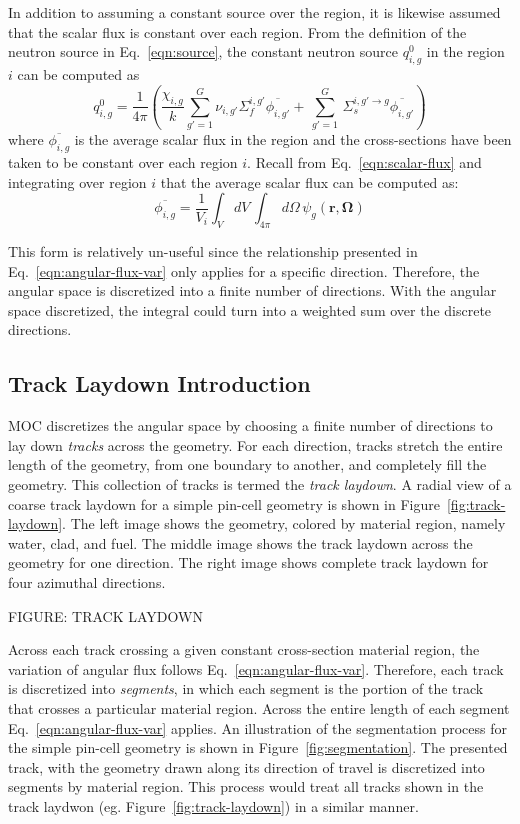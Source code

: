 In addition to assuming a constant source over the region, it is likewise assumed that the scalar flux is constant over each region. From the definition of the neutron source in Eq.~\ref{eqn:source}, the constant neutron source $q^0_{i,g}$ in the region $i$ can be computed as
\begin{equation}
q^0_{i,g} = \frac{1}{4 \pi} \left( \frac{\chi_{i,g}}{k} \sum_{g'=1}^{G} \nu_{i,g'} \Sigma_f^{i,g'} \overline{\phi_{i,g'}} + \, \sum_{g'=1}^G \,  \Sigma_{s}^{i,g' \rightarrow g} \overline{\phi_{i,g'}} \right)
\label{eqn:source-discr}
\end{equation}
where $\overline{\phi_{i,g}}$ is the average scalar flux in the region and the cross-sections have been taken to be constant over each region $i$. Recall from Eq.~\ref{eqn:scalar-flux} and integrating over region $i$ that the average scalar flux can be computed as:
\begin{dmath}
	\overline{\phi_{i,g}} = \frac{1}{V_i}\int_V dV \, \int_{4\pi} d\Omega \, \psi_g(\mathbf{r},\mathbf{\Omega})
	\label{eqn:avg-flux-theory}
\end{dmath}

This form is relatively un-useful since the relationship presented in Eq.~\ref{eqn:angular-flux-var} only applies for a specific direction. Therefore, the angular space is discretized into a finite number of directions. With the angular space discretized, the integral could turn into a weighted sum over the discrete directions.

\subsection{Track Laydown Introduction}

MOC discretizes the angular space by choosing a finite number of directions to lay down \textit{tracks} across the geometry. For each direction, tracks stretch the entire length of the geometry, from one boundary to another, and completely fill the geometry. This collection of tracks is termed the \textit{track laydown}. A radial view of a coarse track laydown for a simple pin-cell geometry is shown in Figure~\ref{fig:track-laydown}. The left image shows the geometry, colored by material region, namely water, clad, and fuel. The middle image shows the track laydown across the geometry for one direction. The right image shows complete track laydown for four azimuthal directions.

FIGURE: TRACK LAYDOWN

Across each track crossing a given constant cross-section material region, the variation of angular flux follows Eq.~\ref{eqn:angular-flux-var}. Therefore, each track is discretized into \textit{segments}, in which each segment is the portion of the track that crosses a particular material region. Across the entire length of each segment Eq.~\ref{eqn:angular-flux-var} applies. An illustration of the segmentation process for the simple pin-cell geometry is shown in Figure~\ref{fig:segmentation}. The presented track, with the geometry drawn along its direction of travel is discretized into segments by material region. This process would treat all tracks shown in the track laydwon (eg. Figure~\ref{fig:track-laydown}) in a similar manner.


